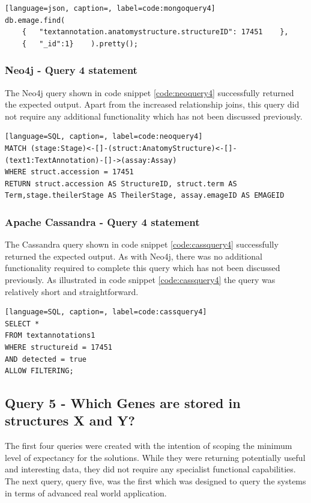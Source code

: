 \begin{lstlisting}[language=json, caption=, label=code:mongoquery4]
db.emage.find(
	{	"textannotation.anatomystructure.structureID": 17451	},
	{	"_id":1}	).pretty();
\end{lstlisting}

\subsubsection*{Neo4j - Query 4 statement}\label{neoquery4statement}
The Neo4j query shown in code snippet \ref{code:neoquery4} successfully returned the expected output. Apart from the increased relationship joins, this query did not require any additional functionality which has not been discussed previously.

\begin{lstlisting}[language=SQL, caption=, label=code:neoquery4]
MATCH (stage:Stage)<-[]-(struct:AnatomyStructure)<-[]-(text1:TextAnnotation)-[]->(assay:Assay)
WHERE struct.accession = 17451
RETURN struct.accession AS StructureID, struct.term AS Term,stage.theilerStage AS TheilerStage, assay.emageID AS EMAGEID
\end{lstlisting}

\subsubsection*{Apache Cassandra - Query 4 statement}\label{cassquery4statement}
The Cassandra query shown in code snippet \ref{code:cassquery4} successfully returned the expected output. As with Neo4j, there was no additional functionality required to complete this query which has not been discussed previously. As illustrated in code snippet \ref{code:cassquery4} the query was relatively short and straightforward.

\begin{lstlisting}[language=SQL, caption=, label=code:cassquery4]
SELECT *
FROM textannotations1
WHERE structureid = 17451
AND detected = true
ALLOW FILTERING;
\end{lstlisting}

\subsection*{Query 5 - Which Genes are stored in structures X and Y?}\label{query5}
The first four queries were created with the intention of scoping the minimum level of expectancy for the solutions. While they were returning potentially useful and interesting data, they did not require any specialist functional capabilities. The next query, query five, was the first which was designed to query the systems in terms of advanced real world application.

